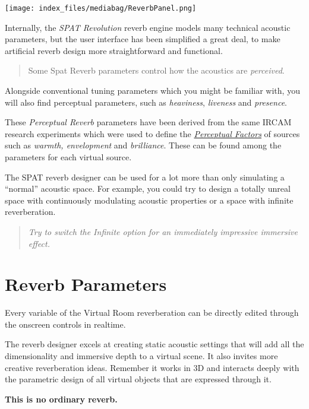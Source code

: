 \documentclass[
  letterpaper,
  DIV=11,
  numbers=noendperiod]{scrreport}
\begin{document}
\texttt{[image: index\_files/mediabag/ReverbPanel.png]}

Internally, the \emph{SPAT Revolution} reverb engine models many
technical acoustic parameters, but the user interface has been
simplified a great deal, to make artificial reverb design more
straightforward and functional.

\begin{quote}
Some Spat Reverb parameters control how the acoustics are
\emph{perceived}.
\end{quote}

Alongside conventional tuning parameters which you might be familiar
with, you will also find perceptual parameters, such as
\emph{heaviness}, \emph{liveness} and \emph{presence}.

These \emph{Perceptual Reverb} parameters have been derived from the
same IRCAM research experiments which were used to define the
\href{Spat_Environment_Source_Parameters?id=perceptual-factors.md}{\emph{Perceptual
Factors}} of sources such as \emph{warmth, envelopment} and
\emph{brilliance}. These can be found among the parameters for each
virtual source.

The SPAT reverb designer can be used for a lot more than only simulating
a ``normal'' acoustic space. For example, you could try to design a
totally unreal space with continuously modulating acoustic properties or
a space with infinite reverberation.

\begin{quote}
\emph{Try to switch the Infinite option for an immediately impressive
immersive effect.}
\end{quote}

\hypertarget{reverb-parameters}{%
\chapter{Reverb Parameters}\label{reverb-parameters}}

Every variable of the Virtual Room reverberation can be directly edited
through the onscreen controls in realtime.

The reverb designer excels at creating static acoustic settings that
will add all the dimensionality and immersive depth to a virtual scene.
It also invites more creative reverberation ideas. Remember it works in
3D and interacts deeply with the parametric design of all virtual
objects that are expressed through it.

\textbf{This is no ordinary reverb.}
\end{document}
